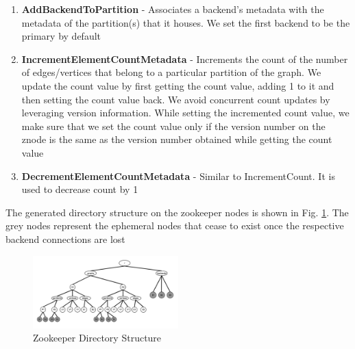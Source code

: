 \documentclass[letterpaper, 11 pt, conference]{ieeeconf}  %
\begin{document}
\begin{enumerate}
\item \textbf{AddBackendToPartition} - Associates a backend's metadata with the metadata of the partition(s) that it houses. We set the first backend to be the primary by default
\item \textbf{IncrementElementCountMetadata} - Increments the count of the number of edges/vertices that belong to a particular partition of the graph. We update the count value by first getting the count value, adding 1 to it and then setting the count value back. We avoid concurrent count updates by leveraging version information. While setting the incremented count value, we make sure that we set the count value only if the version number on the znode is the same as the version number obtained while getting the count value
\item \textbf{DecrementElementCountMetadata} - Similar to IncrementCount. It is used to decrease count by 1
\end{enumerate}

The generated directory structure on the zookeeper nodes is shown in Fig. \ref{fig:zk_graph}. The grey nodes represent the ephemeral nodes that cease to exist once the respective backend connections are lost

\begin{figure}
 \centering
  \includegraphics[width=0.5\textwidth]{zk_graph.png}
\caption{Zookeeper Directory Structure}
\label{fig:zk_graph}
\end{figure}
\end{document}
